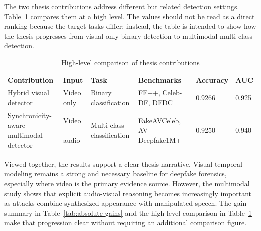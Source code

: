 The two thesis contributions address different but related detection settings. Table~\ref{tab:cross-contribution} compares them at a high level. The values should not be read as a direct ranking because the target tasks differ; instead, the table is intended to show how the thesis progresses from visual-only binary detection to multimodal multi-class detection.

\begin{table}[H]
\centering
\caption{High-level comparison of thesis contributions}
\label{tab:cross-contribution}
\begin{tabular}{p{}p{}p{}p{}p{}p{}}
\toprule
\textbf{Contribution} & \textbf{Input} & \textbf{Task} & \textbf{Benchmarks} & \textbf{Accuracy} & \textbf{AUC} \\
\midrule
Hybrid visual detector & Video only & Binary classification & FF++, Celeb-DF, DFDC & 0.9266 & 0.925 \\
Synchronicity-aware multimodal detector & Video + audio & Multi-class classification & FakeAVCeleb, AV-Deepfake1M++ & 0.9250 & 0.940 \\
\bottomrule
\end{tabular}
\end{table}

Viewed together, the results support a clear thesis narrative. Visual-temporal modeling remains a strong and necessary baseline for deepfake forensics, especially where video is the primary evidence source. However, the multimodal study shows that explicit audio-visual reasoning becomes increasingly important as attacks combine synthesized appearance with manipulated speech. The gain summary in Table~\ref{tab:absolute-gains} and the high-level comparison in Table~\ref{tab:cross-contribution} make that progression clear without requiring an additional comparison figure.